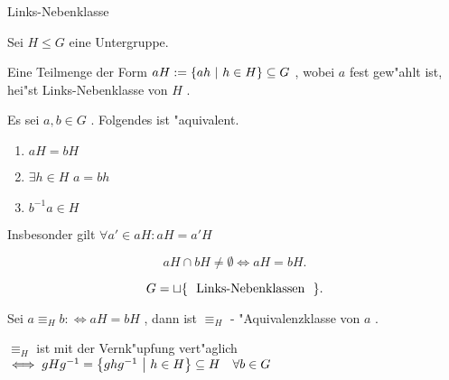 \documentclass[class=article, crop=false]{standalone}
\begin{document}
\begin{zettel}{Links-Nebenklasse}
\begin{flashcard}
    \begin{definition}
        Sei $H \leq G$ eine Untergruppe.

        Eine Teilmenge der Form $aH := \set{ah}{h \in  H} \subseteq G$ , wobei $a$ fest gew"ahlt ist, hei"st Links-Nebenklasse von $H$ .
    \end{definition}
\end{flashcard}

\begin{lemma}
    Es sei $a,b \in  G$ . Folgendes ist "aquivalent.
    \begin{enumerate}
        \item $aH =  bH$ 
        \item $\exists  h \in  H$  $a =  bh$ 
        \item $b^{-1} a \in  H$ 
    \end{enumerate}
    Insbesonder gilt $\forall a' \in  aH : aH =  a'H$ 
\end{lemma}

\begin{corollary}
    \[
        aH \cap bH \neq  \emptyset \iff  aH =  bH
    .\]
\end{corollary}

\begin{corollary}
    \[
        G =  \sqcup \set{\tx{ Links-Nebenklassen } }
    .\]
\end{corollary}

Sei $a \equiv_H b :\iff aH = bH$ , dann ist $\equiv_H$ - "Aquivalenzklasse von $a$ .

\begin{theorem}
    $\equiv_H$ ist mit der Vernk"upfung vert"aglich $\iff gHg^{-1} = \set{ghg^{-1} }{h \in  H} \subseteq H \quad \forall b \in  G$ 
\end{theorem}
    
\end{zettel}
\end{document}
